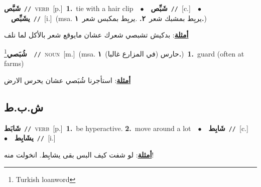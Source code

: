\documentclass[10pt,a4paper,twoside]{article} %
\begin{document}
\begin{multicols}{2}
{\setlength\topsep{0pt}\textbf{\foreignlanguage{arabic}{شَبَّص}}\ {\color{gray}\texttt{//}\color{black}}\ \textsc{verb}\ [p.]\ \textbf{1.}~tie with a hair clip\ \ $\bullet$\ \ \setlength\topsep{0pt}\textbf{\foreignlanguage{arabic}{شَبِّص}}\ {\color{gray}\texttt{//}\color{black}}\ [c.]\ \ $\bullet$\ \ \setlength\topsep{0pt}\textbf{\foreignlanguage{arabic}{يشَبِّص}}\ {\color{gray}\texttt{//}\color{black}}\ [i.]\ \color{gray}(msa. \foreignlanguage{arabic}{يربِط بمشبك شعر}~\foreignlanguage{arabic}{\textbf{٢.}}  .\foreignlanguage{arabic}{يربِط بمكبس شعر}~\foreignlanguage{arabic}{\textbf{١.}})\color{black}\  \begin{flushright}\color{gray}\foreignlanguage{arabic}{\textbf{\underline{\foreignlanguage{arabic}{أمثلة}}}: بدكيش تشبصي شعرك عشان مايوقع شعر بالأكل لما نلف}\end{flushright}\color{black}} \vspace{2mm}

{\setlength\topsep{0pt}\textbf{\foreignlanguage{arabic}{شُبَصي}}\footnote{Turkish loanword}\ \ {\color{gray}\texttt{//}\color{black}}\ \textsc{noun}\ [m.]\ \color{gray}(msa. \foreignlanguage{arabic}{حارس (في المزارع غالبا)}~\foreignlanguage{arabic}{\textbf{١.}})\color{black}\ \textbf{1.}~guard (often at farms)\  \begin{flushright}\color{gray}\foreignlanguage{arabic}{\textbf{\underline{\foreignlanguage{arabic}{أمثلة}}}: استأجرنا شُبَصي عشان يحرس الارض}\end{flushright}\color{black}} \vspace{2mm}

\vspace{-3mm}
\subsection*{\color{blue}\foreignlanguage{arabic}{ش.ب.ط}\color{blue}{}} 

{\setlength\topsep{0pt}\textbf{\foreignlanguage{arabic}{شَابَط}}\ {\color{gray}\texttt{//}\color{black}}\ \textsc{verb}\ [p.]\ \textbf{1.}~be hyperactive.  \textbf{2.}~move around a lot\ \ $\bullet$\ \ \setlength\topsep{0pt}\textbf{\foreignlanguage{arabic}{شَابِط}}\ {\color{gray}\texttt{//}\color{black}}\ [c.]\ \ $\bullet$\ \ \setlength\topsep{0pt}\textbf{\foreignlanguage{arabic}{يشَابِط}}\ {\color{gray}\texttt{//}\color{black}}\ [i.]\  \begin{flushright}\color{gray}\foreignlanguage{arabic}{\textbf{\underline{\foreignlanguage{arabic}{أمثلة}}}: لو شفت كيف البس بقى يشابِط. انخولت منه!}\end{flushright}\color{black}} \vspace{2mm}


\end{multicols}
\end{document}
